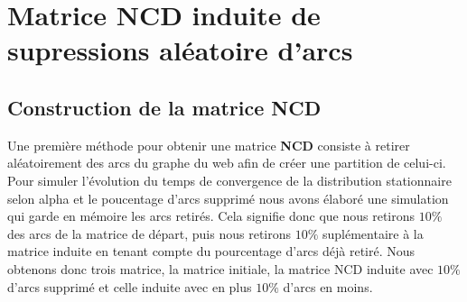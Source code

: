 \documentclass[11pt,oneside,a4paper,french]{article}
\begin{document}
\section{Matrice NCD induite de supressions aléatoire d'arcs}

\subsection{Construction de la matrice NCD}

Une première méthode pour obtenir une matrice \textbf{NCD} consiste à retirer aléatoirement des arcs du graphe du web afin de créer une partition de celui-ci. Pour simuler l'évolution du temps de convergence de la distribution stationnaire selon alpha et le poucentage d'arcs supprimé nous avons élaboré une simulation qui garde en mémoire les arcs retirés. Cela signifie donc que nous retirons $10\%$ des arcs de la matrice de départ, puis nous retirons $10\%$ suplémentaire à la matrice induite en tenant compte du pourcentage d'arcs déjà retiré. Nous obtenons donc trois matrice, la matrice initiale, la matrice NCD induite avec $10\%$ d'arcs supprimé et celle induite avec en plus $10\%$ d'arcs en moins.
\end{document}
